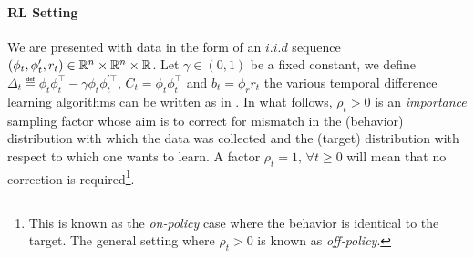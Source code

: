 \paragraph{RL Setting}
We are presented with data in the form of an $i.i.d$ sequence $(\phi_t,\phi'_t,r_t)\in \mathbb{R}^n\times\mathbb{R}^n\times \mathbb{R}$. Let $\gamma \in (0,1)$ be a fixed constant, we define $\Delta_t\eqdef \phi_t\phi_t^\top-\gamma \phi_t\phi_t^{'\top}$, $C_t=\phi_t\phi_t^\top$ and $b_t=\phi_r r_t$ the various temporal difference learning algorithms can be written as in . In what follows, $\rho_t>0$ is an \emph{importance} sampling factor whose aim is to correct for mismatch in the (behavior) distribution with which the data was collected and the (target) distribution with respect to which one wants to learn. A factor $\rho_t=1,\,\forall t\geq 0$ will mean that no correction is required\footnote{This is known as the \emph{on-policy} case where the behavior is identical to the target. The general setting where $\rho_t>0$ is known as \emph{off-policy}.}.
\begin{comment}
\begin{table}

\begin{tabular}{|c|c|c|c|c|}\hline
Quantity& TD(0) & GTD & GTD2 & TDC \\ \hline
$b_t$& $\phi_t r_t$ & $\begin{bmatrix}\phi_t r_t\\ \mathbf{0}_{n\times 1} \end{bmatrix}$ &$\begin{bmatrix}\phi_t r_t\\ \mathbf{0}_{n\times 1} \end{bmatrix}$ & $\begin{bmatrix}\phi_t r_t\\ \phi_t r_t \end{bmatrix}$
\end{tabular}
\end{table}
\end{comment}
